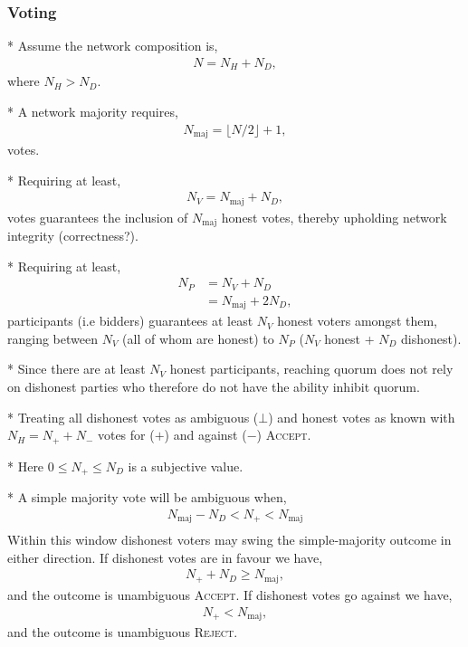 \subsubsection{Voting}

* Assume the network composition is,
\begin{align}
	N=N_H+N_D,
\end{align}
where $N_H>N_D$.

* A network majority requires, 
\begin{align}
	N_\mathrm{maj} = \lfloor N/2\rfloor+1,
\end{align}
votes.

* Requiring at least,
\begin{align}
	N_V = N_\mathrm{maj} + N_D,
\end{align}
votes guarantees the inclusion of $N_\mathrm{maj}$ honest votes, thereby upholding network integrity (correctness?). %

* Requiring at least,
\begin{align}
	N_P &= N_V + N_D \nonumber\\
	&= N_\mathrm{maj} + 2 N_D,
\end{align}
participants (i.e bidders) guarantees at least $N_V$ honest voters amongst them, ranging between $N_V$ (all of whom are honest) to $N_P$ ($N_V$ honest + $N_D$ dishonest).

* Since there are at least $N_V$ honest participants, reaching quorum does not rely on dishonest parties who therefore do not have the ability inhibit quorum.

* Treating all dishonest votes as ambiguous ($\bot$) and honest votes as known with $N_H = N_+ + N_-$ votes for ($+$) and against ($-$) \textsc{Accept}.

* Here $0\leq N_+ \leq N_D$ is a subjective value.

* A simple majority vote will be ambiguous when,
\begin{align}
	N_\mathrm{maj} - N_D < N_+ < N_\mathrm{maj}\nonumber\\
\end{align}
Within this window dishonest voters may swing the simple-majority outcome in either direction.
If dishonest votes are in favour we have,
\begin{align}
	N_+ + N_D \geq N_\mathrm{maj},
\end{align}
and the outcome is unambiguous \textsc{Accept}.
If dishonest votes go against we have,
\begin{align}
	N_+ < N_\mathrm{maj},
\end{align}
and the outcome is unambiguous \textsc{Reject}.

